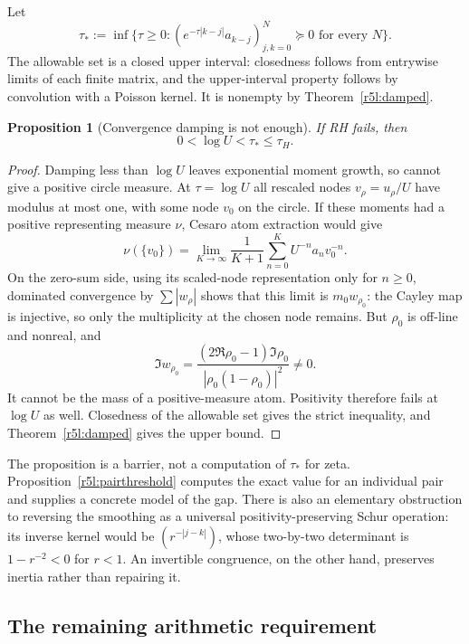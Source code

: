 \documentclass[11pt,a4paper]{article}
\newtheorem{proposition}[theorem]{Proposition}
\theoremstyle{definition}\newtheorem{definition}[theorem]{Definition}
\theoremstyle{remark}\newtheorem{remark}[theorem]{Remark}
\numberwithin{equation}{section}
\begin{document}
Let
\[
 \tau_*:=\inf\{\tau\ge0:
 (e^{-\tau|k-j|}a_{k-j})_{j,k=0}^N\succeq0
 \text{ for every }N\}.
\]
The allowable set is a closed upper interval: closedness follows
from entrywise limits of each finite matrix, and the upper-interval
property follows by convolution with a Poisson kernel.  It is
nonempty by Theorem~\ref{r5l:damped}.

\begin{proposition}[Convergence damping is not enough]
\label{r5l:strictbarrier}
If RH fails, then
\begin{equation}\label{r5l:strictbarriereq}
 0<\log U<\tau_*\le\tau_H.
\end{equation}
\end{proposition}
\begin{proof}
Damping less than $\log U$ leaves exponential moment growth, so
cannot give a positive circle measure.  At $\tau=\log U$ all
rescaled nodes $v_\rho=u_\rho/U$ have modulus at most one, with
some node $v_0$ on the circle.  If these moments had a positive
representing measure $\nu$, Cesaro atom extraction would give
\begin{equation}\label{r5l:atomextract}
 \nu(\{v_0\})=
 \lim_{K\to\infty}\frac1{K+1}
     \sum_{n=0}^K U^{-n}a_nv_0^{-n}.
\end{equation}
On the zero-sum side, using its scaled-node representation only for
$n\ge0$, dominated convergence by $\sum|w_\rho|$
shows that this limit is $m_0w_{\rho_0}$: the Cayley map is
injective, so only the multiplicity at the chosen node remains.
But $\rho_0$ is off-line and nonreal, and
\[
 \Im w_{\rho_0}=
 \frac{(2\Re\rho_0-1)\Im\rho_0}
             {|\rho_0(1-\rho_0)|^2}\ne0.
\]
It cannot be the mass of a positive-measure atom.  Positivity
therefore fails at $\log U$ as well.  Closedness of the allowable
set gives the strict inequality, and Theorem~\ref{r5l:damped}
gives the upper bound.
\end{proof}

The proposition is a barrier, not a computation of $\tau_*$ for
zeta.  Proposition~\ref{r5l:pairthreshold} computes the exact value
for an individual pair and supplies a concrete model of the gap.
There is also an elementary obstruction to reversing the smoothing
as a universal positivity-preserving Schur operation: its inverse
kernel would be $(r^{-|j-k|})$, whose two-by-two determinant is
$1-r^{-2}<0$ for $r<1$.  An invertible congruence, on the other
hand, preserves inertia rather than repairing it.

\subsection{The remaining arithmetic requirement}
\end{document}
